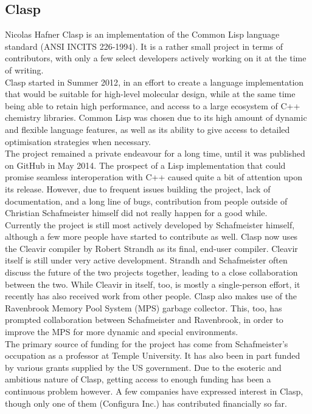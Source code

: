 \subsection{Clasp}{Nicolas Hafner}
Clasp\cite{clasp-github} is an implementation of the Common Lisp language standard (ANSI INCITS 226-1994). It is a rather small project in terms of contributors, with only a few select developers actively working on it at the time of writing. \\

Clasp started in Summer 2012\cite{clasp-timeline}, in an effort to create a language implementation that would be suitable for high-level molecular design, while at the same time being able to retain high performance, and access to a large ecosystem of C++ chemistry libraries\cite{clasp-cando}. Common Lisp was chosen due to its high amount of dynamic and flexible language features, as well as its ability to give access to detailed optimisation strategies when necessary\cite{clasp-talk}. \\

The project remained a private endeavour for a long time, until it was published on GitHub in May 2014\cite{clasp-github}. The prospect of a Lisp implementation that could promise seamless interoperation with C++ caused quite a bit of attention upon its release. However, due to frequent issues building the project, lack of documentation, and a long line of bugs, contribution from people outside of Christian Schafmeister himself did not really happen for a good while. \\

Currently the project is still most actively developed by Schafmeister himself, although a few more people have started to contribute as well. Clasp now uses the Cleavir compiler by Robert Strandh\cite{clasp-cleavir} as its final, end-user compiler. Cleavir itself is still under very active development. Strandh and Schafmeister often discuss the future of the two projects together, leading to a close collaboration between the two. While Cleavir in itself, too, is mostly a single-person effort, it recently has also received work from other people. Clasp also makes use of the Ravenbrook Memory Pool System (MPS)\cite{clasp-mps} garbage collector. This, too, has prompted collaboration between Schafmeister and Ravenbrook, in order to improve the MPS for more dynamic and special environments. \\

The primary source of funding for the project has come from Schafmeister's occupation as a professor at Temple University. It has also been in part funded by various grants supplied by the US government\cite{clasp-grants}. Due to the esoteric and ambitious nature of Clasp, getting access to enough funding has been a continuous problem however. A few companies have expressed interest in Clasp, though only one of them (Configura Inc.) has contributed financially so far.

